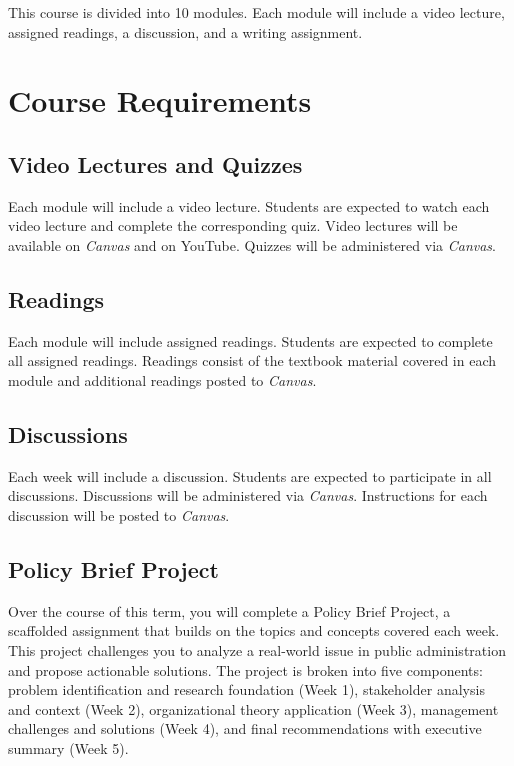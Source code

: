 \documentclass[11pt, letterpaper]{article}
\begin{document}
This course is divided into 10 modules. Each module will include a video lecture, assigned readings, a discussion, and a writing assignment. 

\section{Course Requirements}

\subsection*{Video Lectures and Quizzes}

Each module will include a video lecture. Students are expected to watch each video lecture and complete the corresponding quiz. Video lectures will be available on \emph{Canvas} and on YouTube. Quizzes will be administered via \emph{Canvas}.

\subsection*{Readings}

Each module will include assigned readings. Students are expected to complete all assigned readings. Readings consist of the textbook material covered in each module and additional readings posted to \emph{Canvas}.

\subsection*{Discussions}

Each week will include a discussion. Students are expected to participate in all discussions. Discussions will be administered via \emph{Canvas}. Instructions for each discussion will be posted to \emph{Canvas}.
\subsection*{Policy Brief Project}

Over the course of this term, you will complete a Policy Brief Project, a scaffolded assignment that builds on the topics and concepts covered each week. This project challenges you to analyze a real-world issue in public administration and propose actionable solutions. The project is broken into five components: problem identification and research foundation (Week 1), stakeholder analysis and context (Week 2), organizational theory application (Week 3), management challenges and solutions (Week 4), and final recommendations with executive summary (Week 5).
\vspace{1ex}
\end{document}
